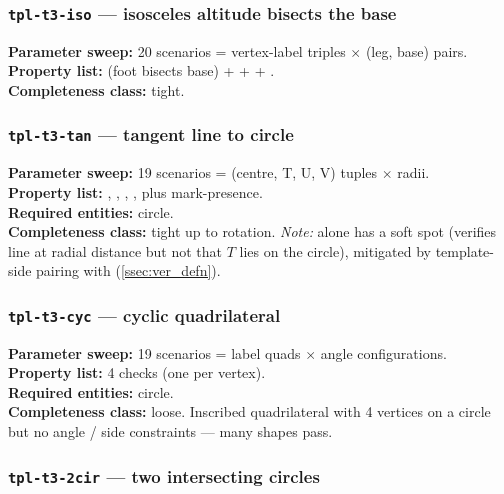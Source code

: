 \subsubsection{\texttt{tpl-t3-iso} --- isosceles altitude bisects the base}

\textbf{Parameter sweep:} 20 scenarios = vertex-label triples $\times$ (leg, base) pairs.\\
\textbf{Property list:}  (foot bisects base) +  +  + .\\
\textbf{Completeness class:} tight.

\subsubsection{\texttt{tpl-t3-tan} --- tangent line to circle}

\textbf{Parameter sweep:} 19 scenarios = (centre, T, U, V) tuples $\times$ radii.\\
\textbf{Property list:} , , , , plus mark-presence.\\
\textbf{Required entities:} circle.\\
\textbf{Completeness class:} tight up to rotation. \emph{Note:}  alone has a soft spot (verifies line at radial distance but not that $T$ lies on the circle), mitigated by template-side pairing with  (\cref{ssec:ver_defn}).

\subsubsection{\texttt{tpl-t3-cyc} --- cyclic quadrilateral}

\textbf{Parameter sweep:} 19 scenarios = label quads $\times$ angle configurations.\\
\textbf{Property list:} 4  checks (one per vertex).\\
\textbf{Required entities:} circle.\\
\textbf{Completeness class:} loose. Inscribed quadrilateral with 4 vertices on a circle but no angle / side constraints --- many shapes pass.

\subsubsection{\texttt{tpl-t3-2cir} --- two intersecting circles}

